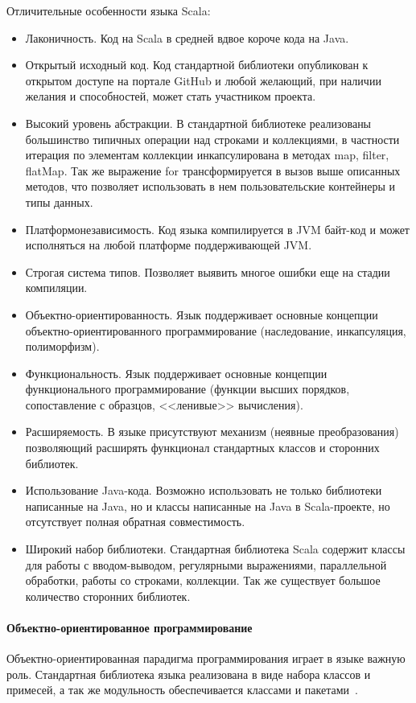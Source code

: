 Отличительные особенности языка Scala:
\begin{itemize}
  \item Лаконичность. Код на Scala в средней вдвое короче кода на Java.
  \item Открытый исходный код. Код стандартной библиотеки опубликован к открытом доступе на портале GitHub и любой желающий, при наличии желания и способностей, может стать участником проекта.
  \item Высокий уровень абстракции. В стандартной библиотеке реализованы большинство типичных операции над строками и коллекциями, в частности итерация по элементам коллекции инкапсулирована в методах map, filter, flatMap. Так же выражение for трансформируется в вызов выше описанных методов, что позволяет использовать в нем пользовательские контейнеры и типы данных. 
  \item Платформонезависимость. Код языка компилируется в JVM байт-код и может исполняться на любой платформе поддерживающей JVM.
  \item Строгая система типов. Позволяет выявить многое ошибки еще на стадии компиляции.
  \item Объектно-ориентированность. Язык поддерживает основные концепции объектно-ориентированного программирование (наследование, инкапсуляция, полиморфизм).
  \item Функциональность. Язык поддерживает основные концепции функционального программирование (функции высших порядков, сопоставление с образцов, <<ленивые>> вычисления).
  \item Расширяемость. В языке присутствуют механизм (неявные преобразования) позволяющий расширять функционал стандартных классов и сторонних библиотек.
  \item Использование Java-кода. Возможно использовать не только библиотеки написанные на Java, но и классы написанные на Java в Scala-проекте, но отсутствует полная обратная совместимость.
  \item Широкий набор библиотеки. Стандартная библиотека Scala содержит классы для работы с вводом-выводом, регулярными выражениями, параллельной обработки, работы со строками, коллекции. Так же существует большое количество сторонних библиотек.
\end{itemize}

\paragraph{Объектно-ориентированное программирование}
Объектно-ориентированная парадигма программирования играет в языке важную роль. Стандартная библиотека языка реализована в виде набора классов и примесей, а так же модульность обеспечивается классами и пакетами~\cite{horsman_scala}.


